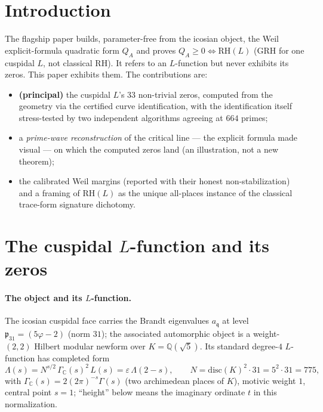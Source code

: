 \documentclass[11pt]{article}
\theoremstyle{remark}
\newcommand{\KK}{K}
\newcommand{\RH}{\mathrm{RH}}
\newcommand{\fq}{\mathfrak{q}}
\newcommand{\GC}{\Gamma_{\mathbb{C}}}
\begin{document}
\section{Introduction}\label{sec:intro}

The flagship paper \cite{Flagship} builds, parameter-free from the icosian object, the Weil
explicit-formula quadratic form $Q_A$ and proves $Q_A\ge0\iff\RH(L)$ (GRH for one cuspidal
$L$, not classical $\RH$). It refers to an $L$-function but never exhibits its zeros. This
paper exhibits them. The contributions are:
\begin{itemize}\itemsep1pt
\item[\S\ref{sec:zeros}] \textbf{(principal)} the cuspidal $L$'s $33$ non-trivial zeros,
computed from the geometry via the certified curve identification, with the identification
itself stress-tested by two independent algorithms agreeing at $664$ primes;
\item[\S\ref{sec:diff}] a \emph{prime-wave reconstruction} of the critical line --- the
explicit formula made visual --- on which the computed zeros land (an illustration, not a
new theorem);
\item[\S\ref{sec:weil}--\S\ref{sec:local}] the calibrated Weil margins (reported with their
honest non-stabilization) and a framing of $\RH(L)$ as the unique all-places instance of
the classical trace-form signature dichotomy.
\end{itemize}

\section{The cuspidal $L$-function and its zeros}\label{sec:zeros}

\paragraph{The object and its $L$-function.} The icosian cuspidal face carries the Brandt
eigenvalues $a_\fq$ at level $\mathfrak{p}_{31}=(5\varphi-2)$ (norm $31$); the associated
automorphic object is a weight-$(2,2)$ Hilbert modular newform over $\KK=\mathbb{Q}(\sqrt5)$.
Its standard degree-$4$ $L$-function has completed form
\[
\Lambda(s)=N^{s/2}\,\GC(s)^2\,L(s)=\varepsilon\,\Lambda(2-s),\qquad
N=\mathrm{disc}(\KK)^2\cdot31=5^2\cdot31=775,
\]
with $\GC(s)=2(2\pi)^{-s}\Gamma(s)$ (two archimedean places of $\KK$), motivic weight $1$,
central point $s=1$; ``height'' below means the imaginary ordinate $t$ in this
normalization.
\end{document}
